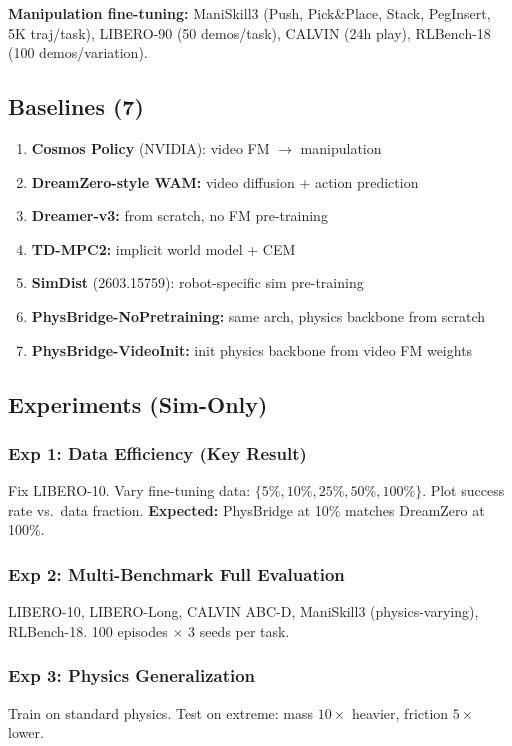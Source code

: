 \documentclass[11pt,a4paper]{article}
\begin{document}
\textbf{Manipulation fine-tuning:} ManiSkill3 (Push, Pick\&Place, Stack, PegInsert, 5K traj/task), LIBERO-90 (50 demos/task), CALVIN (24h play), RLBench-18 (100 demos/variation).

\subsection{Baselines (7)}
\begin{enumerate}[nosep]
\item \textbf{Cosmos Policy} (NVIDIA): video FM $\to$ manipulation
\item \textbf{DreamZero-style WAM:} video diffusion + action prediction
\item \textbf{Dreamer-v3:} from scratch, no FM pre-training
\item \textbf{TD-MPC2:} implicit world model + CEM
\item \textbf{SimDist} (2603.15759): robot-specific sim pre-training
\item \textbf{PhysBridge-NoPretraining:} same arch, physics backbone from scratch
\item \textbf{PhysBridge-VideoInit:} init physics backbone from video FM weights
\end{enumerate}

\subsection{Experiments (Sim-Only)}

\subsubsection{Exp 1: Data Efficiency (Key Result)}
Fix LIBERO-10. Vary fine-tuning data: $\{5\%, 10\%, 25\%, 50\%, 100\%\}$. Plot success rate vs.\ data fraction. \textbf{Expected:} PhysBridge at 10\% matches DreamZero at 100\%.

\subsubsection{Exp 2: Multi-Benchmark Full Evaluation}
LIBERO-10, LIBERO-Long, CALVIN ABC-D, ManiSkill3 (physics-varying), RLBench-18. 100 episodes $\times$ 3 seeds per task.

\subsubsection{Exp 3: Physics Generalization}
Train on standard physics. Test on extreme: mass $10\times$ heavier, friction $5\times$ lower.
\end{document}
